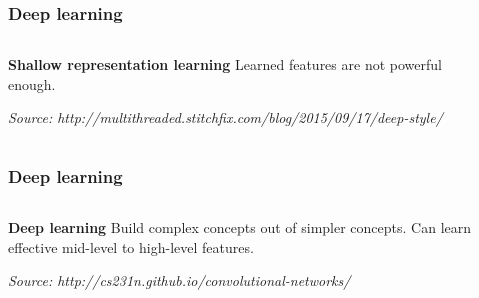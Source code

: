 \begin{frame}[t]
\frametitle{Deep learning}
\vspace{-1cm}
\begin{columns}[T]
\begin{column}{0.4\textwidth}
\vspace{1cm}
\begin{block}{\bf Shallow representation learning}
Learned features are not powerful enough.
\end{block}

{\tiny\em Source: http://multithreaded.stitchfix.com/blog/2015/09/17/deep-style/}
\end{column}\hfill

\begin{column}{0.6\textwidth}
\end{column}
\end{columns}

\end{frame}

\begin{frame}[t]
\frametitle{Deep learning}
\vspace{-1cm}
\begin{columns}[T]
\begin{column}{0.4\textwidth}
\vspace{1cm}
\begin{block}{\bf Deep learning}
Build complex concepts out of simpler concepts. Can learn effective mid-level to high-level features.
\end{block}

{\tiny\em Source: http://cs231n.github.io/convolutional-networks/}
\end{column}\hfill

\begin{column}{0.6\textwidth}
\end{column}
\end{columns}

\end{frame}

